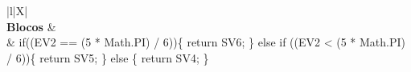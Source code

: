 \begin{xltabular}{\textwidth}{|l|X|}
		 \\ \hline
		\textbf{Blocos} &  \\ \hline
		 & if((EV2 == (5 * Math.PI) / 6))\{   return SV6; \} else if ((EV2 < (5 * Math.PI) / 6))\{   return SV5; \} else \{   return SV4; \} \\ \hline


\end{xltabular}
